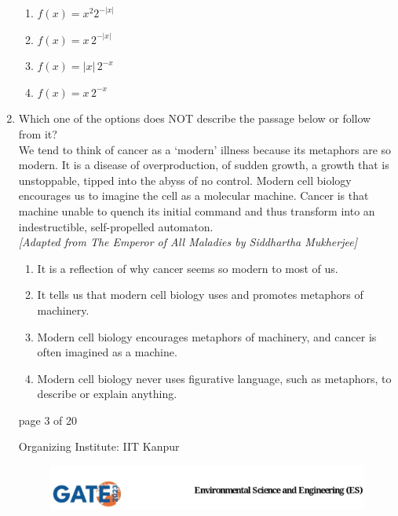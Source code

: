 \documentclass[journal,12pt,onecolumn]{IEEEtran}
\theoremstyle{remark}
\begin{document}
\begin{enumerate}[start=1, label={Q\arabic*.}]
\begin{enumerate}[label=(\Alph*)]
\item $f(x) = x^2 2^{-|x|}$
\item $f(x) = x \, 2^{-|x|}$
\item $f(x) = |x| \, 2^{-x}$
\item $f(x) = x \, 2^{-x}$
\end{enumerate}
\hfill{}
\item Which one of the options does NOT describe the passage below or follow from it? \\[0.5em]
We tend to think of cancer as a `modern' illness because its metaphors are so modern. It is a disease of overproduction, of sudden growth, a growth that is unstoppable, tipped into the abyss of no control. Modern cell biology encourages us to imagine the cell as a molecular machine. Cancer is that machine unable to quench its initial command  and thus transform into an indestructible, self-propelled automaton. \\[0.5em]
\textit{[Adapted from The Emperor of All Maladies by Siddhartha Mukherjee]} \\[0.5em]

\begin{enumerate}[label=(\Alph*)]
\item It is a reflection of why cancer seems so modern to most of us.
\item It tells us that modern cell biology uses and promotes metaphors of machinery.
\item Modern cell biology encourages metaphors of machinery, and cancer is often imagined as a machine.
\item Modern cell biology never uses figurative language, such as metaphors, to describe or explain anything.
\end{enumerate}
\hfill{}
\vfill
\begin{center}
{\Large page 3 of 20}
\end{center}
\RaggedRight
{\color{orange}
{\Large Organizing Institute: IIT Kanpur}}
\newpage
\begin{figure}
    
    \includegraphics[width=1\linewidth]{figs/latex.jpg}
    

\end{figure}
\end{enumerate}
\end{document}
